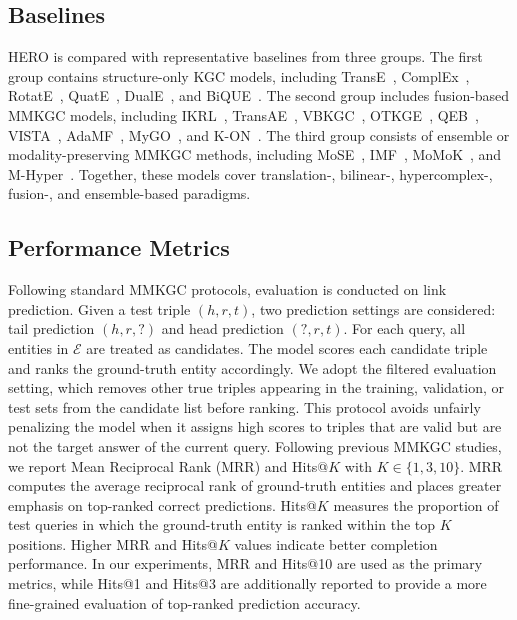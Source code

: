 \documentclass[pdflatex,sn-mathphys-num]{sn-jnl}
\begin{document}
\subsection{Baselines}

HERO is compared with representative baselines from three groups. The first group contains structure-only KGC models, including TransE~\cite{bordes2013transe}, ComplEx~\cite{trouillon2016complex}, RotatE~\cite{sun2019rotate}, QuatE~\cite{zhang2019quate}, DualE~\cite{cao2021duale}, and BiQUE~\cite{guo2021bique}. The second group includes fusion-based MMKGC models, including IKRL~\cite{xie2017ikrl}, TransAE~\cite{wang2019transae}, VBKGC~\cite{zhang2022vbkgc}, OTKGE~\cite{cao2022otkge}, QEB~\cite{wang2023qeb}, VISTA~\cite{lee2023vista}, AdaMF~\cite{zhang2024adamfmat}, MyGO~\cite{zhang2025mygo}, and K-ON~\cite{guo2025kon}. The third group consists of ensemble or modality-preserving MMKGC methods, including MoSE~\cite{zhao2022mose}, IMF~\cite{li2023imf}, MoMoK~\cite{zhang2025momok}, and M-Hyper~\cite{liu2026mhyper}. Together, these models cover translation-, bilinear-, hypercomplex-, fusion-, and ensemble-based paradigms.

\subsection{Performance Metrics}

Following standard MMKGC protocols, evaluation is conducted on link prediction. Given a test triple $(h,r,t)$, two prediction settings are considered: tail prediction $(h,r,?)$ and head prediction $(?,r,t)$. For each query, all entities in $\mathcal{E}$ are treated as candidates. The model scores each candidate triple and ranks the ground-truth entity accordingly.
We adopt the filtered evaluation setting, which removes other true triples appearing in the training, validation, or test sets from the candidate list before ranking. This protocol avoids unfairly penalizing the model when it assigns high scores to triples that are valid but are not the target answer of the current query. Following previous MMKGC studies, we report Mean Reciprocal Rank (MRR) and Hits@$K$ with $K \in \{1,3,10\}$.
MRR computes the average reciprocal rank of ground-truth entities and places greater emphasis on top-ranked correct predictions. Hits@$K$ measures the proportion of test queries in which the ground-truth entity is ranked within the top $K$ positions. Higher MRR and Hits@$K$ values indicate better completion performance. In our experiments, MRR and Hits@10 are used as the primary metrics, while Hits@1 and Hits@3 are additionally reported to provide a more fine-grained evaluation of top-ranked prediction accuracy.
\end{document}

